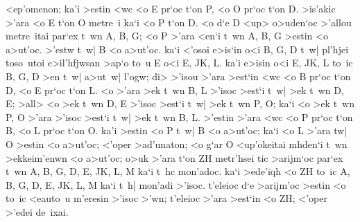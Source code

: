 \begin{Parallel}{}{}
{{<ep'omenon; ka'i >estin <wc <o E pr`oc t`on P, <o O
pr`oc t`on D. >is'akic >'ara <o E t`on O metre~i ka`i <o P t`on D.
 <o d`e D <up> o>uden`oc >'allou metre~itai
par`ex t~wn A, B, G; <o P >'ara <en`i t~wn A, B, G >estin <o a>ut'oc. >'estw
t~w| B <o a>ut'oc. ka`i <'osoi e>is`in o<i B, G, D t~w| pl'hjei toso~utoi
e>il'hfjwsan >ap`o to~u E o<i E, JK, L. ka'i e>isin o<i E, JK, L to~ic
B, G, D >en t~w| a>ut~w| l'ogw; di> >'isou >'ara >est`in <wc <o B pr`oc
t`on D, <o E pr`oc t`on L. <o >'ara >ek t~wn B, L >'isoc >est`i t~w| >ek t~wn
D, E; >all> <o >ek t~wn D, E >'isoc >est`i t~w| >ek t~wn
P, O; ka`i <o >ek t~wn P, O >'ara >'isoc >est`i t~w| >ek t~wn B, L. >'estin
>'ara <wc <o P pr`oc t`on B, <o L pr`oc t`on O. ka'i >estin <o P t~w| B
<o a>ut'oc; ka`i <o L >'ara tw| O >estin <o a>ut'oc;  <'oper >ad'unaton;
<o g`ar O <up'okeitai mhden`i t~wn >ekkeim'enwn <o a>ut'oc; o>uk
>'ara t`on ZH metr'hsei tic >arijm`oc par`ex t~wn A, B, G, D, E, JK, L, M
ka`i t~hc mon'adoc. ka`i >ede'iqh <o ZH to~ic A, B, G, D, E, JK, L, M
ka`i t~h| mon'adi >'isoc. t'eleioc d`e >arijm'oc >estin <o to~ic <eauto~u
m'eresin >'isoc >'wn; t'eleioc >'ara >est`in <o ZH; <'oper >'edei de~ixai.}}

\end{Parallel}
